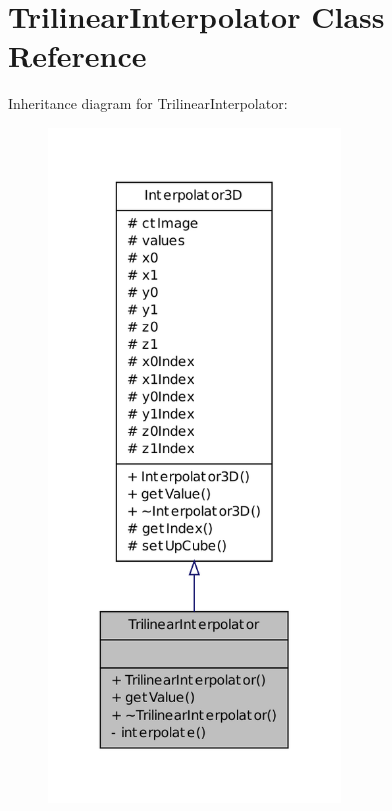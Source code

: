 \hypertarget{class_trilinear_interpolator}{
\section{TrilinearInterpolator Class Reference}
\label{class_trilinear_interpolator}
}


Inheritance diagram for TrilinearInterpolator:
\nopagebreak
\begin{figure}[H]
\begin{center}
\leavevmode
\includegraphics[width=220pt]{class_trilinear_interpolator__inherit__graph}
\end{center}
\end{figure}


